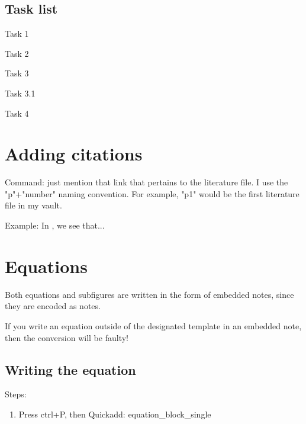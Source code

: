 \subsection{Task list}

\begin{todolist}
\item Task 1
\item Task 2
\item Task 3
\begin{todolist}
\item Task 3.1
\end{todolist}
\item Task 4
\end{todolist}
\section{Adding citations} \label{sec:Adding-citations}

Command: just mention that link that pertains to the literature file. I use the "p"+"number" naming convention. For example, "p1" would be the first literature file in my vault.



Example: In \cite{p1}, we see that...  \hypertarget{ad3b86}{}



\section{Equations}

Both equations and subfigures are written in the form of embedded notes, since they are encoded as notes.

\begin{tcolorbox}[width=1.0\textwidth,colback={red},title={warning},outer arc=0mm,colupper=white]

If you write an equation outside of the designated template in an embedded note, then the conversion will be faulty!

\end{tcolorbox}

\subsection{Writing the equation}



Steps:



\begin{enumerate}
\item Press ctrl+P, then Quickadd: equation\_block\_single
\end{enumerate}




